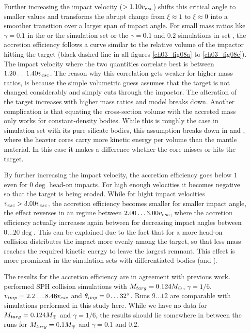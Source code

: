 Further increasing the impact velocity ($> 1.10 v_{esc}$) shifts this critical angle to smaller values and transforms the abrupt change from $\xi \approx 1$ to $\xi \approx 0$ into a smoother transition over a larger span of impact angle. For small mass ratios like $\gamma = 0.1$ in the \css or the simulation set or the $\gamma = 0.1$ and $0.2$ simulations in set \rss, the accretion efficiency follows a curve similar to the relative volume of the impactor hitting the target (black dashed line in all figures \ref{ch03_fig08a} to \ref{ch03_fig08c}). The impact velocity where the two quantities correlate best is between $1.20 \dots 1.40 v_{esc}$. The reason why this correlation gets weaker for higher mass ratios, is because the simple volumetric guess assumes that the target is not changed considerably and simply cuts through the impactor. The alteration of the target increases with higher mass ratios and model breaks down. Another complication is that equating the cross-section volume with the accreted mass only works for constant-density bodies. While this is roughly the case in simulation set \rss with its pure silicate bodies, this assumption breaks down in \css and \iss, where the heavier cores carry more kinetic energy per volume than the mantle material. In this case it makes a difference whether the core misses or hits the target. 

By further increasing the impact velocity, the accretion efficiency goes below $1$ even for $0 \deg$ head-on impacts. For high enough velocities it becomes negative so that the target is being eroded. While for hight impact velocities $v_{esc} > 3.00 v_{esc}$, the accretion efficiency becomes smaller for smaller impact angle, the effect reverses in an regime between $2.00 \dots 3.00 v_{esc}$, where the accretion efficiency actually increases again between for decreasing impact angles between $0 \dots 20 \deg$. This can be explained due to the fact that for a more head-on collision distributes the impact more evenly among the target, so that less mass reaches the required kinetic energy to leave the largest remnant. This effect is more prominent in the simulation sets with differentiated bodies (\css and \iss).

The results for the accretion efficiency are in agreement with previous work. \cite{Benz:1988p3336} performed SPH collision simulations with $M_{targ} = 0.124 M_{\oplus}$, $\gamma = 1/6$, $v_{imp} = 2.2 \dots 8.46 v_{esc}$ and $\theta_{imp} = 0 \dots 32 ^\circ$. Runs $9 \dots 12$ are comparable with simulations performed in this study here. While we have no data for $M_{targ} = 0.124 M_{\oplus}$ and $\gamma = 1/6$, the results should lie somewhere in between the runs for $M_{targ} = 0.1 M_{\oplus}$ and $\gamma = 0.1$ and $0.2$. 



